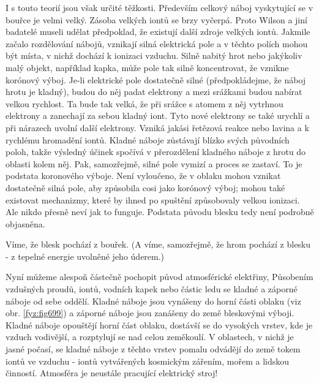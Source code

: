    I s touto teorií jsou však určité těžkosti. Především celkový náboj vyskytující se v bouřce je
    velmi velký. Zásoba velkých iontů se brzy vyčerpá. Proto Wilson a jiní badatelé museli udělat
    předpoklad, že existují další zdroje velkých iontů. Jakmile začalo rozdělování nábojů, vznikají
    silná elektrická pole a v těchto polích mohou být místa, v nichž dochází k ionizaci vzduchu.
    Silně nabitý hrot nebo jakýkoliv malý objekt, například kapka, může pole tak silně koncentrovat,
    že vznikne korónový výboj. Je-li elektrické pole dostatečně silné (předpokládejme, že náboj
    hrotu je kladný), budou do něj padat elektrony a mezi srážkami budou nabírat velkou rychlost. Ta
    bude tak velká, že při srážce s atomem z něj vytrhnou elektrony a zanechají za sebou kladný
    iont. Tyto nové elektrony se také urychlí a při nárazech uvolní další elektrony. Vzniká jakási
    řetězová reakce nebo lavina a k rychlému hromadění iontů. Kladné náboje zůstávají blízko svých
    původních poloh, takže výsledný účinek spočívá v přerozdělení kladného náboje z hrotu do oblasti
    kolem něj. Pak, samozřejmě, silné pole vymizí a proces se zastaví. To je podstata koronového
    výboje. Není vyloučeno, že v oblaku mohou vznikat dostatečně silná pole, aby způsobila cosi jako
    korónový výboj; mohou také existovat mechanizmy, které by ihned po spuštění způsobovaly velkou
    ionizaci. Ale nikdo přesně neví jak to funguje. Podstata původu blesku tedy není podrobně
    objasněna.

    Víme, že blesk pochází z bouřek. (A víme, samozřejmě, že hrom pochází z blesku - z tepelné
    energie uvolněné jeho úderem.)

    Nyní můžeme alespoň částečně pochopit původ atmosférické elektřiny, Působením vzdušných proudů,
    iontů, vodních kapek nebo částic ledu se kladné a záporné náboje od sebe oddělí. Kladné náboje
    jsou vynášeny do horní části oblaku (viz obr. \ref{fyz:fig699}) a záporné náboje jsou zanášeny
    do země bleskovými výboji. Kladné náboje opouštějí horní část oblaku, dostávší se do vysokých
    vrstev, kde je vzduch vodivější, a rozptylují se nad celou zeměkoulí. V oblastech, v nichž je
    jasné počasí, se kladné náboje z těchto vrstev pomalu odvádějí do země tokem iontů ve vzduchu -
    iontů vytvářených kosmickým zářením, mořem a lidskou činností. Atmosféra je neustále pracující
    elektrický stroj!

